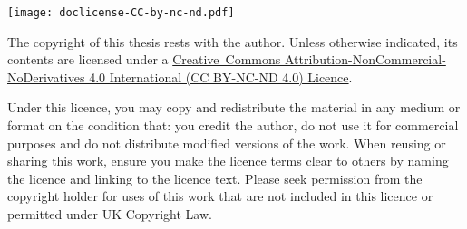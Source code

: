 \noindent
\begin{minipage}[b]{0.3275\textwidth}
    \noindent \raggedright \texttt{[image: doclicense-CC-by-nc-nd.pdf]}
\end{minipage}
\hfill
\hspace*{0.0225\textwidth}
\begin{minipage}[b]{0.65\textwidth}
    The    copyright    of    this     thesis    rests    with    the    author.
    Unless   otherwise    indicated,   its    contents   are    licensed   under
    a   \href{https://creativecommons.org/licenses/by-nc-nd/4.0/}{\mbox{Creative
    Commons}   Attribution-NonCommercial-NoDerivatives  4.0   International  (CC
    BY-NC-ND 4.0) Licence}.
\end{minipage}

\noindent Under this licence, you may  copy and redistribute the material in any
medium or format on the condition that: you credit the author, do not use it for
commercial purposes  and do not distribute  modified versions of the  work. When
reusing or sharing this work, ensure you  make the licence terms clear to others
by naming  the licence and linking  to the licence text.  Please seek permission
from the copyright  holder for uses of  this work that are not  included in this
licence or permitted under UK Copyright Law.

\vfill

